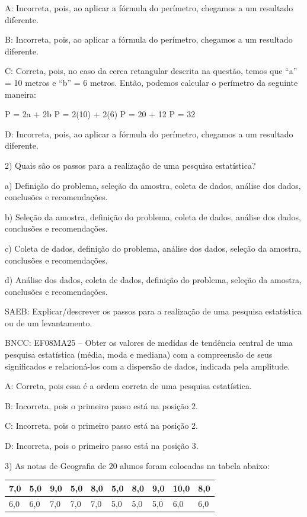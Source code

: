A: Incorreta, pois, ao aplicar a fórmula do perímetro, chegamos a um
resultado diferente.

B: Incorreta, pois, ao aplicar a fórmula do perímetro, chegamos a um
resultado diferente.

C: Correta, pois, no caso da cerca retangular descrita na questão, temos
que ``a'' = 10 metros e ``b'' = 6 metros. Então, podemos calcular o
perímetro da seguinte maneira:

P = 2a + 2b P = 2(10) + 2(6) P = 20 + 12 P = 32

D: Incorreta, pois, ao aplicar a fórmula do perímetro, chegamos a um
resultado diferente.

2) Quais são os passos para a realização de uma pesquisa estatística?

a) Definição do problema, seleção da amostra, coleta de dados, análise
dos dados, conclusões e recomendações.

b) Seleção da amostra, definição do problema, coleta de dados, análise
dos dados, conclusões e recomendações.

c) Coleta de dados, definição do problema, análise dos dados, seleção da
amostra, conclusões e recomendações.

d) Análise dos dados, coleta de dados, definição do problema, seleção da
amostra, conclusões e recomendações.

SAEB: Explicar/descrever os passos para a realização de uma pesquisa
estatística ou de um levantamento.

BNCC: EF08MA25 -- Obter os valores de medidas de tendência central de
uma pesquisa estatística (média, moda e mediana) com a compreensão de
seus significados e relacioná-los com a dispersão de dados, indicada
pela amplitude.

A: Correta, pois essa é a ordem correta de uma pesquisa estatística.

B: Incorreta, pois o primeiro passo está na posição 2.

C: Incorreta, pois o primeiro passo está na posição 2.

D: Incorreta, pois o primeiro passo está na posição 3.

3) As notas de Geografia de 20 alunos foram colocadas na tabela abaixo:


\begin{longtable}[]{@{}llllllllll@{}}
\toprule
7,0 & 5,0 & 9,0 & 5,0 & 8,0 & 5,0 & 8,0 & 9,0 & 10,0 &
8,0\tabularnewline
\midrule
\endhead
6,0 & 6,0 & 7,0 & 7,0 & 7,0 & 5,0 & 5,0 & 5,0 & 6,0 & 6,0\tabularnewline
\bottomrule
\end{longtable}

